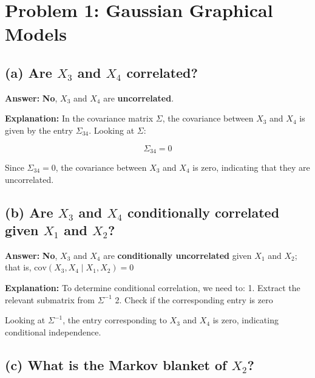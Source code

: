 \documentclass{article}
\begin{document}
\begin{center}
\end{center}

\section*{Problem 1: Gaussian Graphical Models}

\subsection*{(a) Are $X_3$ and $X_4$ correlated?}

\textbf{Answer:} \textbf{No}, $X_3$ and $X_4$ are \textbf{uncorrelated}.

\textbf{Explanation:}
In the covariance matrix $\Sigma$, the covariance between $X_3$ and $X_4$ is given by the entry $\Sigma_{34}$. Looking at $\Sigma$:

$$\Sigma_{34} = 0$$

Since $\Sigma_{34} = 0$, the covariance between $X_3$ and $X_4$ is zero, indicating that they are uncorrelated.

\subsection*{(b) Are $X_3$ and $X_4$ conditionally correlated given $X_1$ and $X_2$?}

\textbf{Answer:} \textbf{No}, $X_3$ and $X_4$ are \textbf{conditionally uncorrelated} given $X_1$ and $X_2$; that is, $\text{cov}(X_3, X_4 \mid X_1, X_2) = 0$

\textbf{Explanation:}
To determine conditional correlation, we need to:
1. Extract the relevant submatrix from $\Sigma^{-1}$
2. Check if the corresponding entry is zero

Looking at $\Sigma^{-1}$, the entry corresponding to $X_3$ and $X_4$ is zero, indicating conditional independence.

\subsection*{(c) What is the Markov blanket of $X_2$?}
\end{document}
